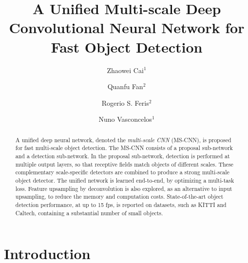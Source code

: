 \documentclass[runningheads]{llncs}
\begin{document}
\pagestyle{headings}
\mainmatter

\title{A Unified Multi-scale Deep Convolutional Neural Network for Fast Object Detection} 


\author{Zhaowei Cai$^1$\and Quanfu Fan$^2$\and Rogerio S. Feris$^2$\and Nuno Vasconcelos$^1$}




\maketitle

\begin{abstract}
A unified deep neural network, denoted the {\it multi-scale CNN\/} (MS-CNN),
is proposed for fast multi-scale object detection. The MS-CNN
consists of a proposal sub-network and a detection sub-network. In the
proposal sub-network, detection is performed at multiple output layers,
so that receptive fields match objects of different scales. These
complementary scale-specific detectors are combined to produce a strong
multi-scale object detector. The unified network is learned end-to-end, by
optimizing a multi-task loss. Feature upsampling by deconvolution is also
explored, as an alternative to input upsampling, to reduce the memory and
computation costs. State-of-the-art object detection performance, at up
to 15 fps, is reported on datasets, such as KITTI and Caltech, containing a substantial number of small objects.

\end{abstract}


\section{Introduction}
\end{document}
